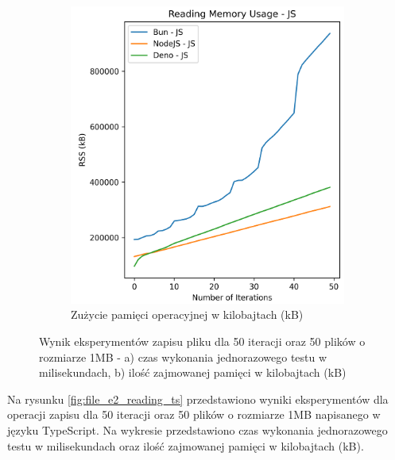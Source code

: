 \begin{figure}[H]
  \begin{subfigure}[b]{0.4\textwidth}
    \centering
    \includegraphics[width=\textwidth]{Figures/files/files_writing_50_2000_50_js_memory.png}
    \caption{Zużycie pamięci operacyjnej w kilobajtach (kB)}
    \label{fig:file_e2_writing_js_memory}
  \end{subfigure}
  \caption{Wynik eksperymentów zapisu pliku dla 50 iteracji oraz 50 plików o rozmiarze 1MB - a) czas wykonania jednorazowego testu w milisekundach, b) ilość zajmowanej pamięci w kilobajtach (kB)}
  \label{fig:file_e2_writing_js}
\end{figure}

Na rysunku \ref{fig:file_e2_reading_ts} przedstawiono wyniki eksperymentów dla operacji zapisu dla 50 iteracji oraz 50 plików o rozmiarze 1MB napisanego w języku TypeScript. Na wykresie przedstawiono czas wykonania jednorazowego testu w milisekundach oraz ilość zajmowanej pamięci w kilobajtach (kB).

